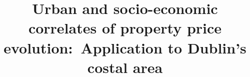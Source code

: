 \documentclass[conference,final,]{IEEEtran}
\begin{document}
%
\title{Urban and socio-economic correlates of property price evolution:~Application to Dublin's costal area}


\author{










}


%
\end{document}
